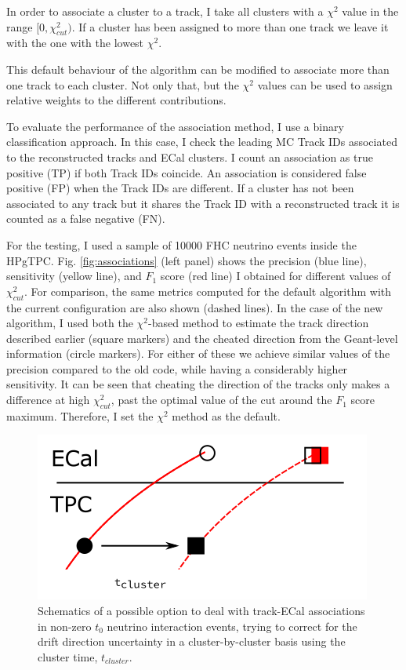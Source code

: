 In order to associate a cluster to a track, I take all clusters with a $\chi^{2}$ value in the range $[0, \chi^{2}_{cut})$. If a cluster has been assigned to more than one track we leave it with the one with the lowest $\chi^{2}$.

This default behaviour of the algorithm can be modified to associate more than one track to each cluster. Not only that, but the $\chi^{2}$ values can be used to assign relative weights to the different contributions.

To evaluate the performance of the association method, I use a binary classification approach. In this case, I check the leading MC Track IDs associated to the reconstructed tracks and ECal clusters. I count an association as true positive (TP) if both Track IDs coincide. An association is considered false positive (FP) when the Track IDs are different. If a cluster has not been associated to any track but it shares the Track ID with a reconstructed track it is counted as a false negative (FN).

For the testing, I used a sample of 10000 FHC neutrino events inside the HPgTPC. Fig. \ref{fig:associations} (left panel) shows the precision (blue line), sensitivity (yellow line), and $F_{1}$ score (red line) I obtained for different values of $\chi^{2}_{cut}$. For comparison, the same metrics computed for the default algorithm with the current configuration are also shown (dashed lines). In the case of the new algorithm, I used both the $\chi^{2}$-based method to estimate the track direction described earlier (square markers) and the cheated direction from the Geant-level information (circle markers). For either of these we achieve similar values of the precision compared to the old code, while having a considerably higher sensitivity. It can be seen that cheating the direction of the tracks only makes a difference at high $\chi^{2}_{cut}$, past the optimal value of the cut around the $F_{1}$ score maximum. Therefore, I set the $\chi^{2}$ method as the default.

\begin{figure}[t]
	\centering
	\includegraphics[width=.55\linewidth]{Images/GArSoft_PID/associations/drift_correction.png}
	\caption{Schematics of a possible option to deal with track-ECal associations in non-zero $t_{0}$ neutrino interaction events, trying to correct for the drift direction uncertainty in a cluster-by-cluster basis using the cluster time, $t_{cluster}$.}
	\label{fig:associations_drift}
\end{figure}


